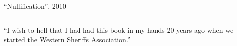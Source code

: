 \begin{frame}{``Nullification'', 2010}
\begin{columns}[c]
{            \vspace{10pt}
                \large{``I wish to hell that I had had this book in my hands 20 years ago when we started the Western Sheriffs Association.''}
            }
    \end{columns}
\end{frame}


